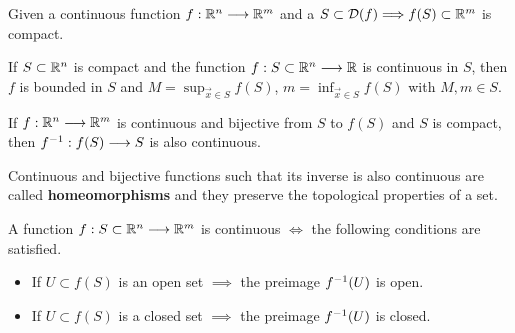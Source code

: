 \begin{theorem}
    Given a continuous function $\appl{f}{\Rtn}{\R^m}$ and a  $S\subset\dom{f}\implies f(S)\subset\R^m$
    is compact.
\end{theorem}

\begin{theorem}
    If $S\subset\Rtn$ is compact and the function $\appl{f}{S\subset\Rtn}{\R}$ is continuous in $S$, then $f$ is bounded
    in $S$ and $M = \sup_{\vec{x}\in S} f(S)$, $m = \inf_{\vec{x}\in S} f(S)$ with $M, m\in S$.
\end{theorem}

\begin{theorem}
    If $\appl{f}{\Rtn}{\R^m}$ is continuous and bijective from $S$ to $f(S)$ and $S$ is compact, then 
    $f ^{-1} : f(S)\longrightarrow S$ is also continuous.
\end{theorem}

\begin{note}
    Continuous and bijective functions such that its inverse is also continuous are called \textbf{homeomorphisms} and they
    preserve the topological properties of a set.
\end{note}

\begin{theorem}
    A function $\appl{f}{S\subset\Rtn}{\R^m}$ is continuous $\iff$ the following conditions are satisfied.
        \begin{itemize}[itemsep = -2pt, topsep = -2pt]
            \item If $U\subset f(S)$ is an open set $\implies$ the preimage $f ^{-1}(U)$ is open.
            \item If $U\subset f(S)$ is a closed set $\implies$ the preimage $f ^{-1}(U)$ is closed.        
        \end{itemize}
\end{theorem}

